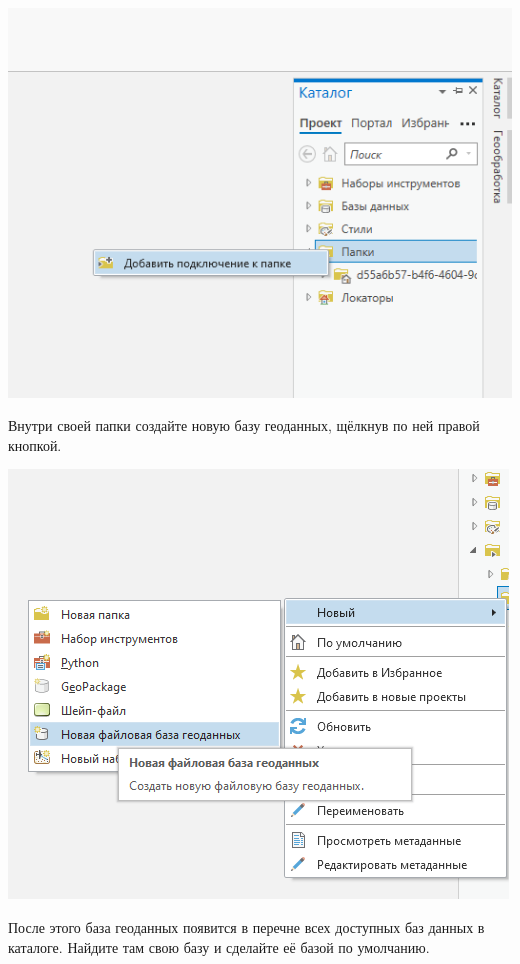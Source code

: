 \documentclass[
  12pt,
]{book}
\begin{document}
\includegraphics{images/Ref01/Add_Connection.png}

Внутри своей папки создайте новую базу геоданных, щёлкнув по ней правой кнопкой.

\includegraphics{images/Ref01/New_GDB.png}

После этого база геоданных появится в перечне всех доступных баз данных в каталоге. Найдите там свою базу и сделайте её базой по умолчанию.
\end{document}
